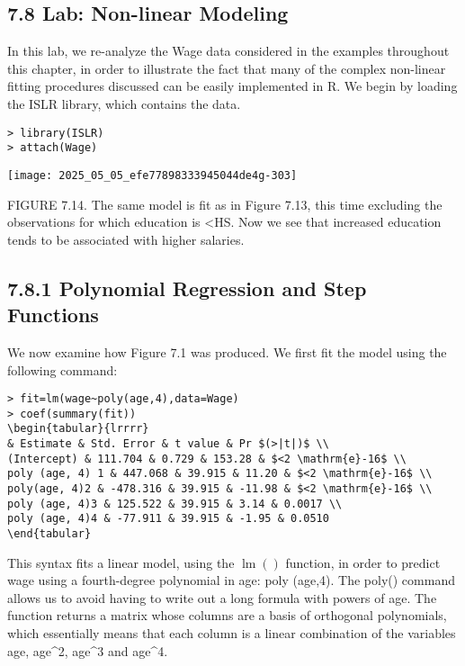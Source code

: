 \documentclass[10pt]{article}
\begin{document}
\subsection*{7.8 Lab: Non-linear Modeling}
In this lab, we re-analyze the Wage data considered in the examples throughout this chapter, in order to illustrate the fact that many of the complex non-linear fitting procedures discussed can be easily implemented in R. We begin by loading the ISLR library, which contains the data.

\begin{verbatim}
> library(ISLR)
> attach(Wage)
\end{verbatim}

\begin{center}
\texttt{[image: 2025\_05\_05\_efe77898333945044de4g-303]}
\end{center}

FIGURE 7.14. The same model is fit as in Figure 7.13, this time excluding the observations for which education is <HS. Now we see that increased education tends to be associated with higher salaries.

\subsection*{7.8.1 Polynomial Regression and Step Functions}
We now examine how Figure 7.1 was produced. We first fit the model using the following command:

\begin{verbatim}
> fit=lm(wage~poly(age,4),data=Wage)
> coef(summary(fit))
\begin{tabular}{lrrrr} 
& Estimate & Std. Error & t value & Pr $(>|t|)$ \\
(Intercept) & 111.704 & 0.729 & 153.28 & $<2 \mathrm{e}-16$ \\
poly (age, 4) 1 & 447.068 & 39.915 & 11.20 & $<2 \mathrm{e}-16$ \\
poly(age, 4)2 & -478.316 & 39.915 & -11.98 & $<2 \mathrm{e}-16$ \\
poly (age, 4)3 & 125.522 & 39.915 & 3.14 & 0.0017 \\
poly (age, 4)4 & -77.911 & 39.915 & -1.95 & 0.0510
\end{tabular}
\end{verbatim}

This syntax fits a linear model, using the $\operatorname{lm}()$ function, in order to predict wage using a fourth-degree polynomial in age: poly (age,4). The poly() command allows us to avoid having to write out a long formula with powers of age. The function returns a matrix whose columns are a basis of orthogonal polynomials, which essentially means that each column is a linear combination of the variables age, age\^{}2, age\^{}3 and age\^{}4.
\end{document}
